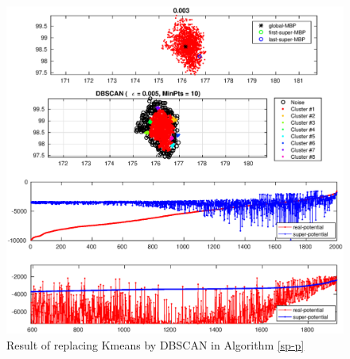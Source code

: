 \documentclass[10pt]{article}
\begin{document}
\begin{figure}[h]
\centering
\includegraphics[scale=0.45]{sp_p_dbscan}%
\caption{Result of replacing Kmeans by DBSCAN in Algorithm \ref{sp-p}}
\label{fig:sp_dbscan}
\end{figure}
\end{document}
